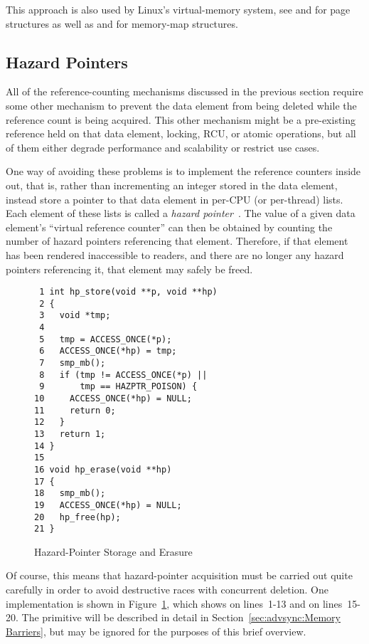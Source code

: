 This approach is also used by Linux's virtual-memory system,
see  and  for
page structures as well as  and 
for memory-map structures.

\subsection{Hazard Pointers}
\label{sec:defer:Hazard Pointers}

All of the reference-counting mechanisms discussed in the previous
section require some other mechanism to prevent the data element from
being deleted while the reference count is being acquired.
This other mechanism might be a pre-existing reference held on that
data element, locking, RCU, or atomic operations, but all of them
either degrade performance and scalability or restrict use cases.

One way of avoiding these problems is to implement the reference counters
inside out, that is, rather than incrementing an integer stored in the
data element, instead store a pointer to that data element in
per-CPU (or per-thread) lists.
Each element of these lists is called a
\emph{hazard pointer}~\cite{MagedMichael04a}.
The value of a given data element's ``virtual reference counter'' can
then be obtained by counting the number of hazard pointers referencing
that element.
Therefore, if that element has been rendered inaccessible to readers,
and there are no longer any hazard pointers referencing it, that element
may safely be freed.

\begin{figure}[tbp]
{ \scriptsize
\begin{verbatim}
 1 int hp_store(void **p, void **hp)
 2 {
 3   void *tmp;
 4 
 5   tmp = ACCESS_ONCE(*p);
 6   ACCESS_ONCE(*hp) = tmp;
 7   smp_mb();
 8   if (tmp != ACCESS_ONCE(*p) ||
 9       tmp == HAZPTR_POISON) {
10     ACCESS_ONCE(*hp) = NULL;
11     return 0;
12   }
13   return 1;
14 }
15 
16 void hp_erase(void **hp)
17 {
18   smp_mb();
19   ACCESS_ONCE(*hp) = NULL;
20   hp_free(hp);
21 }
\end{verbatim}
}
\caption{Hazard-Pointer Storage and Erasure}
\label{fig:defer:Hazard-Pointer Storage and Erasure}
\end{figure}

Of course, this means that hazard-pointer acquisition must be carried
out quite carefully in order to avoid destructive races with concurrent
deletion.
One implementation is shown in
Figure~\ref{fig:defer:Hazard-Pointer Storage and Erasure},
which shows  on lines~1-13 and  on
lines~15-20.
The  primitive will be described in detail in
Section~\ref{sec:advsync:Memory Barriers}, but may be ignored for
the purposes of this brief overview.

